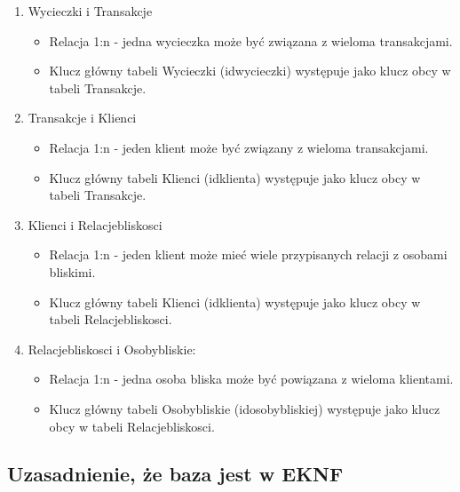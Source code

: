 \documentclass{article}
\begin{document}
\begin{enumerate}
		\item Wycieczki i Transakcje
		\begin{itemize}
			\item Relacja 1:n - jedna wycieczka może być związana z wieloma transakcjami.
			\item Klucz główny tabeli Wycieczki (id\textunderscore wycieczki) występuje jako klucz obcy w tabeli Transakcje.
		\end{itemize}
		
		\item Transakcje i Klienci
		\begin{itemize}
			\item Relacja 1:n - jeden klient może być związany z wieloma transakcjami.
			\item Klucz główny tabeli Klienci (id\textunderscore klienta) występuje jako klucz obcy w tabeli Transakcje.
		\end{itemize}
		
		\item Klienci i Relacje\textunderscore bliskosci
		\begin{itemize}
			\item Relacja 1:n - jeden klient może mieć wiele przypisanych relacji z osobami bliskimi.
			\item Klucz główny tabeli Klienci (id\textunderscore klienta) występuje jako klucz obcy w tabeli Relacje\textunderscore bliskosci.
		\end{itemize}
		
		\item Relacje\textunderscore bliskosci i Osoby\textunderscore bliskie: 
		\begin{itemize}
			\item Relacja 1:n - jedna osoba bliska może być powiązana z wieloma klientami.
			\item Klucz główny tabeli Osoby\textunderscore bliskie (id\textunderscore osoby\textunderscore bliskiej) występuje jako klucz obcy w tabeli Relacje\textunderscore bliskosci.
		\end{itemize}
		 
	\end{enumerate}
	
	\subsection{Uzasadnienie, że baza jest w EKNF}
	
\end{document}
